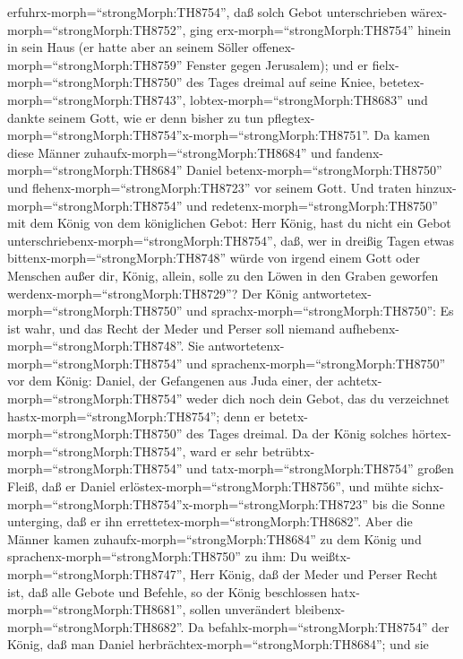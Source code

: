 erfuhrx-morph=``strongMorph:TH8754'', daß solch Gebot unterschrieben
wärex-morph=``strongMorph:TH8752'', ging
erx-morph=``strongMorph:TH8754'' hinein in sein Haus (er hatte aber an
seinem Söller offenex-morph=``strongMorph:TH8759'' Fenster gegen
Jerusalem); und er fielx-morph=``strongMorph:TH8750'' des Tages dreimal
auf seine Kniee, betetex-morph=``strongMorph:TH8743'',
lobtex-morph=``strongMorph:TH8683'' und dankte seinem Gott, wie er denn
bisher zu tun
pflegtex-morph=``strongMorph:TH8754''x-morph=``strongMorph:TH8751''.
 Da kamen diese Männer zuhaufx-morph=``strongMorph:TH8684''
und fandenx-morph=``strongMorph:TH8684'' Daniel
betenx-morph=``strongMorph:TH8750'' und
flehenx-morph=``strongMorph:TH8723'' vor seinem Gott.  Und
traten hinzux-morph=``strongMorph:TH8754'' und
redetenx-morph=``strongMorph:TH8750'' mit dem König von dem königlichen
Gebot: Herr König, hast du nicht ein Gebot
unterschriebenx-morph=``strongMorph:TH8754'', daß, wer in dreißig Tagen
etwas bittenx-morph=``strongMorph:TH8748'' würde von irgend einem Gott
oder Menschen außer dir, König, allein, solle zu den Löwen in den Graben
geworfen werdenx-morph=``strongMorph:TH8729''? Der König
antwortetex-morph=``strongMorph:TH8750'' und
sprachx-morph=``strongMorph:TH8750'': Es ist wahr, und das Recht der
Meder und Perser soll niemand aufhebenx-morph=``strongMorph:TH8748''.
 Sie antwortetenx-morph=``strongMorph:TH8754'' und
sprachenx-morph=``strongMorph:TH8750'' vor dem König: Daniel, der
Gefangenen aus Juda einer, der achtetx-morph=``strongMorph:TH8754''
weder dich noch dein Gebot, das du verzeichnet
hastx-morph=``strongMorph:TH8754''; denn er
betetx-morph=``strongMorph:TH8750'' des Tages dreimal.  Da
der König solches hörtex-morph=``strongMorph:TH8754'', ward er sehr
betrübtx-morph=``strongMorph:TH8754'' und
tatx-morph=``strongMorph:TH8754'' großen Fleiß, daß er Daniel
erlöstex-morph=``strongMorph:TH8756'', und mühte
sichx-morph=``strongMorph:TH8754''x-morph=``strongMorph:TH8723'' bis die
Sonne unterging, daß er ihn errettetex-morph=``strongMorph:TH8682''.
 Aber die Männer kamen zuhaufx-morph=``strongMorph:TH8684''
zu dem König und sprachenx-morph=``strongMorph:TH8750'' zu ihm: Du
weißtx-morph=``strongMorph:TH8747'', Herr König, daß der Meder und
Perser Recht ist, daß alle Gebote und Befehle, so der König beschlossen
hatx-morph=``strongMorph:TH8681'', sollen unverändert
bleibenx-morph=``strongMorph:TH8682''.  Da
befahlx-morph=``strongMorph:TH8754'' der König, daß man Daniel
herbrächtex-morph=``strongMorph:TH8684''; und sie
